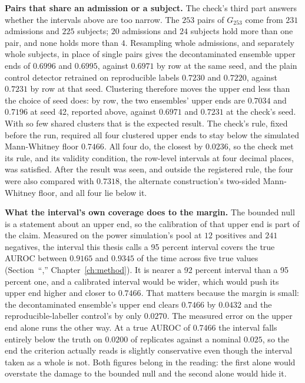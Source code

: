 \textbf{Pairs that share an admission or a subject.} The check's third part answers whether the intervals above are
too narrow. The $253$ pairs of $G_{253}$ come from $231$ admissions and $225$ subjects; $20$ admissions and $24$
subjects hold more than one pair, and none holds more than $4$. Resampling whole admissions, and separately whole
subjects, in place of single pairs gives the decontaminated ensemble upper ends of $0.6996$ and $0.6995$, against
$0.6971$ by row at the same seed, and the plain control detector retrained on reproducible labels $0.7230$ and $0.7220$, against $0.7231$ by row at
that seed. Clustering therefore moves the upper end less than the choice of seed does: by row, the two ensembles'
upper ends are $0.7034$ and $0.7196$ at seed 42, reported above, against $0.6971$ and $0.7231$ at the check's seed.
With so few shared clusters that is the expected result. The check's rule, fixed before the run, required all four clustered upper ends to stay below the simulated Mann-Whitney floor $0.7466$. All four do, the closest by $0.0236$, so the check met its rule, and its validity condition, the row-level intervals at four decimal places, was satisfied. After the result was seen, and outside the registered rule, the four were also compared with $0.7318$, the
alternate construction's two-sided Mann-Whitney floor, and all four lie below it.

\textbf{What the interval's own coverage does to the margin.} The bounded null is a statement about
an upper end, so the calibration of that upper end is part of the claim. Measured on the power
simulation's pool at $12$ positives and $241$ negatives, the interval this thesis calls a 95 percent
interval covers the true AUROC between $0.9165$ and $0.9345$ of the time across five true values
(Section~``,'' Chapter~\ref{ch:method}). It is nearer a 92 percent interval than
a 95 percent one, and a calibrated interval would be wider, which would push its upper end higher and
closer to $0.7466$. That matters because the margin is small: the decontaminated ensemble's upper end
clears $0.7466$ by $0.0432$ and the reproducible-labeller control's by only $0.0270$. The measured error
on the upper end alone runs the other way. At a true AUROC of $0.7466$ the interval falls entirely below
the truth on $0.0200$ of replicates against a nominal $0.025$, so the end the criterion actually reads is
slightly conservative even though the interval taken as a whole is not. Both figures belong in the
reading: the first alone would overstate the damage to the bounded null and the second alone would hide it.

